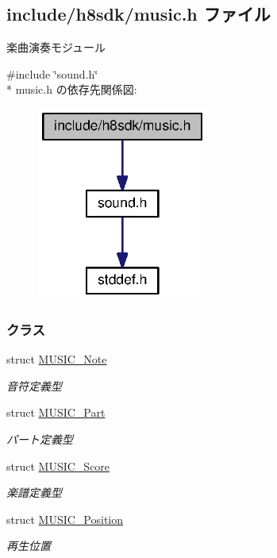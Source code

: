 \subsection{include/h8sdk/music.h ファイル}
\label{music_8h}


楽曲演奏モジュール  


{\ttfamily \#include \char`\"{}sound.\+h\char`\"{}}\\*
music.\+h の依存先関係図\+:
\nopagebreak
\begin{figure}[H]
\begin{center}
\leavevmode
\includegraphics[width=159pt]{d7/d6e/music_8h__incl}
\end{center}
\end{figure}
\subsubsection*{クラス}
\begin{DoxyCompactItemize}
\item 
struct \hyperlink{music_8h_df/dbe/structMUSIC__Note}{M\+U\+S\+I\+C\+\_\+\+Note}
\begin{DoxyCompactList}\small\item\em 音符定義型 \end{DoxyCompactList}\item 
struct \hyperlink{music_8h_d2/d40/structMUSIC__Part}{M\+U\+S\+I\+C\+\_\+\+Part}
\begin{DoxyCompactList}\small\item\em パート定義型 \end{DoxyCompactList}\item 
struct \hyperlink{music_8h_d3/dd6/structMUSIC__Score}{M\+U\+S\+I\+C\+\_\+\+Score}
\begin{DoxyCompactList}\small\item\em 楽譜定義型 \end{DoxyCompactList}\item 
struct \hyperlink{music_8h_dd/d9f/structMUSIC__Position}{M\+U\+S\+I\+C\+\_\+\+Position}
\begin{DoxyCompactList}\small\item\em 再生位置 \end{DoxyCompactList}\end{DoxyCompactItemize}
